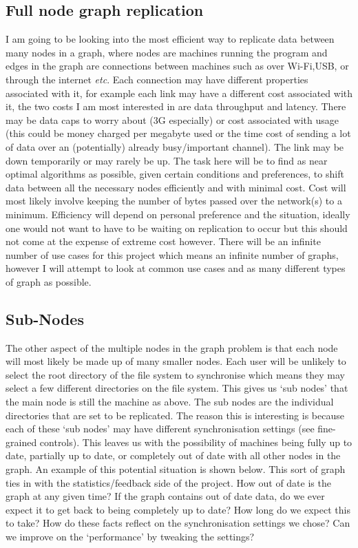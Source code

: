 \documentclass[12pt]{article}
\begin{document}
\subsection{Full node graph replication}
I am going to be looking into the most efficient way to
replicate data between many nodes in a graph, where nodes are machines
running the program and edges in the graph are connections
between machines such as over Wi-Fi,USB, or through the internet \emph{etc}.
Each connection may have different properties associated
with it, for example each link may have a different cost
associated with it, the two costs I am most interested in
are data throughput and latency. There may be data caps to worry about
(3G especially) or cost associated with usage
(this could be money charged per megabyte used or
the time cost of sending a lot of data over an (potentially)
already busy/important channel). The link may be down
temporarily or may rarely be up. The task here will be
to find as near optimal algorithms as possible,
given certain conditions and preferences,
to shift data between all the necessary nodes
efficiently and with minimal cost. 
Cost will most likely involve keeping the number
of bytes passed over the network(s) to a minimum.
Efficiency will depend on personal preference and
the situation, ideally one would not want to have
to be waiting on replication to occur but this
should not come at the expense of extreme cost however.
There will be an infinite number of use cases for this
project which means an infinite number of graphs,
however I will attempt to look at common use cases
and as many different types of graph as possible.

\subsection{Sub-Nodes}

The other aspect of the multiple nodes in the graph problem
is that each node will most likely be made up of many smaller nodes.
Each user will be unlikely to select the root directory of the
file system to synchronise which means they may select a few
different directories on the file system. This gives us ‘sub nodes’
that the main node is still the machine as above. The sub nodes are
the individual directories that are set to be replicated.
The reason this is interesting is because each of these ‘sub nodes’
may have different synchronisation settings (see fine-grained controls).
This leaves us with the possibility of machines being fully up to date,
partially up to date, or completely out of date with all other nodes in
the graph. An example of this potential situation is shown below.
This sort of graph ties in with the statistics/feedback side of the
project. How out of date is the graph at any given time?
If the graph contains out of date data, do we ever expect it
to get back  to being completely up to date? How long do we expect
this to take? How do these facts reflect on the synchronisation settings
we chose? Can we improve on the ‘performance’ by tweaking the settings?
\end{document}
